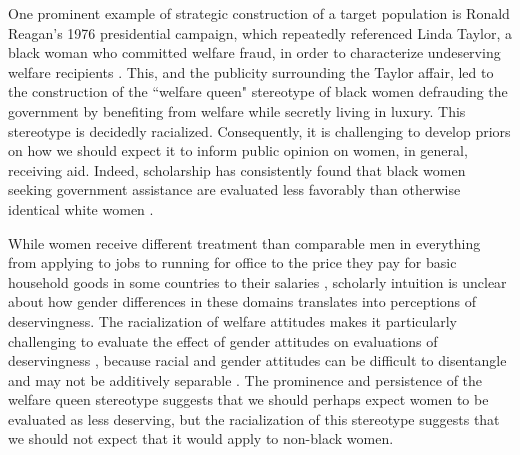 \documentclass[12pt]{article}%
\begin{document}
\begin{doublespace}

One prominent example of strategic construction of a target population is Ronald Reagan's 1976 presidential campaign, which repeatedly referenced Linda Taylor, a black woman who committed welfare fraud, in order to characterize undeserving welfare recipients \citep{gilman2013return}. This, and the publicity surrounding the Taylor affair, led to the construction of the ``welfare queen" stereotype of black women defrauding the government by benefiting from welfare while secretly living in luxury. This stereotype is decidedly racialized. Consequently, it is challenging to develop priors on how we should expect it to inform public opinion on women, in general, receiving aid. Indeed, scholarship has consistently found that black women seeking government assistance are evaluated less favorably than otherwise identical white women \citep{gilliam_welfare_1999, desante_working_2013, hayes_2020, cassese2019intersectional, gilens_why_2000}.

While women receive different treatment than comparable men in everything from applying to jobs \citep{neumark_sex_1996, goldin_orchestrating_2000, quadlin_market} to running for office \citep{hassell_partys_2019, clayton_how_2020} to the price they pay for basic household goods in some countries \citep{betz_womens_2021} to their salaries \citep{castillo_gender_2013, mandel_up_2013}, scholarly intuition is unclear about how gender differences in these domains translates into perceptions of deservingness. The racialization of welfare attitudes makes it particularly challenging to evaluate the effect of gender attitudes on evaluations of deservingness \citep{winter_beyond_2006}, because racial and gender attitudes can be difficult to disentangle and may not be additively separable \citep{hayes2021race}. The prominence and persistence of the welfare queen stereotype suggests that we should perhaps expect women to be evaluated as less deserving, but the racialization of this stereotype suggests that we should not expect that it would apply to non-black women. 


\end{doublespace}
\end{document}

